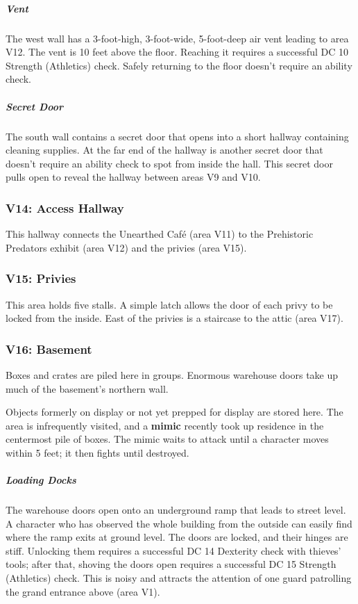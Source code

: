 \documentclass[10pt,a4paper,twoside,bg=print,twocolumn,openany,nodeprecatedcode]{dndbook}
\begin{document}
\subparagraph{Vent}
The west wall has a 3-foot-high, 3-foot-wide, 5-foot-deep air vent leading to area V12. The vent is 10 feet above the floor. Reaching it requires a successful DC 10 Strength (Athletics) check. Safely returning to the floor doesn't require an ability check.

\subparagraph{Secret Door}
The south wall contains a secret door that opens into a short hallway containing cleaning supplies. At the far end of the hallway is another secret door that doesn't require an ability check to spot from inside the hall. This secret door pulls open to reveal the hallway between areas V9 and V10.

\subsubsection{V14: Access Hallway}
This hallway connects the Unearthed Café (area V11) to the Prehistoric Predators exhibit (area V12) and the privies (area V15).

\subsubsection{V15: Privies}
This area holds five stalls. A simple latch allows the door of each privy to be locked from the inside. East of the privies is a staircase to the attic (area V17).

\subsubsection{V16: Basement}
\begin{DndReadAloud}{}
Boxes and crates are piled here in groups. Enormous warehouse doors take up much of the basement's northern wall.

\end{DndReadAloud}

Objects formerly on display or not yet prepped for display are stored here. The area is infrequently visited, and a \textbf{mimic} recently took up residence in the centermost pile of boxes. The mimic waits to attack until a character moves within 5 feet; it then fights until destroyed.

\subparagraph{Loading Docks}
The warehouse doors open onto an underground ramp that leads to street level. A character who has observed the whole building from the outside can easily find where the ramp exits at ground level. The doors are locked, and their hinges are stiff. Unlocking them requires a successful DC 14 Dexterity check with thieves' tools; after that, shoving the doors open requires a successful DC 15 Strength (Athletics) check. This is noisy and attracts the attention of one guard patrolling the grand entrance above (area V1).
\end{document}
